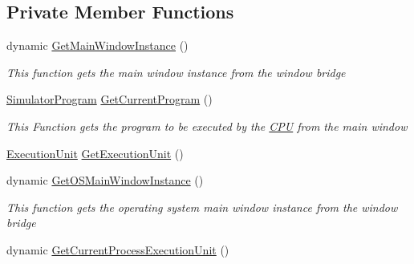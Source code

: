 \subsection*{Private Member Functions}
\begin{DoxyCompactItemize}
\item 
dynamic \hyperlink{class_c_p_u___o_s___simulator_1_1_c_p_u_1_1_interrupts_1_1_vectored_interrupt_a1ae10e2559f1f2bbbbb65e3cf3af6079}{Get\+Main\+Window\+Instance} ()
\begin{DoxyCompactList}\small\item\em This function gets the main window instance from the window bridge \end{DoxyCompactList}\item 
\hyperlink{class_c_p_u___o_s___simulator_1_1_c_p_u_1_1_simulator_program}{Simulator\+Program} \hyperlink{class_c_p_u___o_s___simulator_1_1_c_p_u_1_1_interrupts_1_1_vectored_interrupt_a4efaab313e8227ff3dd40db5734299b5}{Get\+Current\+Program} ()
\begin{DoxyCompactList}\small\item\em This Function gets the program to be executed by the \hyperlink{namespace_c_p_u___o_s___simulator_1_1_c_p_u}{C\+P\+U} from the main window \end{DoxyCompactList}\item 
\hyperlink{class_c_p_u___o_s___simulator_1_1_c_p_u_1_1_execution_unit}{Execution\+Unit} \hyperlink{class_c_p_u___o_s___simulator_1_1_c_p_u_1_1_interrupts_1_1_vectored_interrupt_a9ab8f385691cc675f4600efce35ad762}{Get\+Execution\+Unit} ()
\item 
dynamic \hyperlink{class_c_p_u___o_s___simulator_1_1_c_p_u_1_1_interrupts_1_1_vectored_interrupt_adfc13310ff7194132c7d4d45faaec5d9}{Get\+O\+S\+Main\+Window\+Instance} ()
\begin{DoxyCompactList}\small\item\em This function gets the operating system main window instance from the window bridge \end{DoxyCompactList}\item 
dynamic \hyperlink{class_c_p_u___o_s___simulator_1_1_c_p_u_1_1_interrupts_1_1_vectored_interrupt_acfa023cdf9c19c9b4725d9f2dee76caa}{Get\+Current\+Process\+Execution\+Unit} ()
\end{DoxyCompactItemize}

